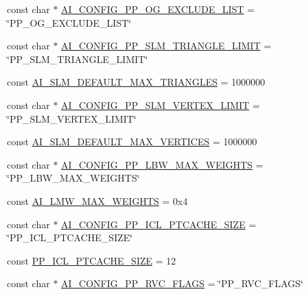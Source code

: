 \begin{DoxyCompactItemize}
\item 
const char $\ast$ \hyperlink{namespaceassimp_1_1config_a6d97e821d31bab71a6f4bae280a127a2}{A\+I\+\_\+\+C\+O\+N\+F\+I\+G\+\_\+\+P\+P\+\_\+\+O\+G\+\_\+\+E\+X\+C\+L\+U\+D\+E\+\_\+\+L\+I\+S\+T} = \char`\"{}P\+P\+\_\+\+O\+G\+\_\+\+E\+X\+C\+L\+U\+D\+E\+\_\+\+L\+I\+S\+T\char`\"{}
\item 
const char $\ast$ \hyperlink{namespaceassimp_1_1config_a63b46327cb4682e7e19471c787307482}{A\+I\+\_\+\+C\+O\+N\+F\+I\+G\+\_\+\+P\+P\+\_\+\+S\+L\+M\+\_\+\+T\+R\+I\+A\+N\+G\+L\+E\+\_\+\+L\+I\+M\+I\+T} = \char`\"{}P\+P\+\_\+\+S\+L\+M\+\_\+\+T\+R\+I\+A\+N\+G\+L\+E\+\_\+\+L\+I\+M\+I\+T\char`\"{}
\item 
const \hyperlink{namespaceassimp_1_1config_a53c98559d8d9613a5823df0a5c593c1e}{A\+I\+\_\+\+S\+L\+M\+\_\+\+D\+E\+F\+A\+U\+L\+T\+\_\+\+M\+A\+X\+\_\+\+T\+R\+I\+A\+N\+G\+L\+E\+S} = 1000000
\item 
const char $\ast$ \hyperlink{namespaceassimp_1_1config_a7efcd666dddd6efdd21dbacdc5a66fec}{A\+I\+\_\+\+C\+O\+N\+F\+I\+G\+\_\+\+P\+P\+\_\+\+S\+L\+M\+\_\+\+V\+E\+R\+T\+E\+X\+\_\+\+L\+I\+M\+I\+T} = \char`\"{}P\+P\+\_\+\+S\+L\+M\+\_\+\+V\+E\+R\+T\+E\+X\+\_\+\+L\+I\+M\+I\+T\char`\"{}
\item 
const \hyperlink{namespaceassimp_1_1config_a645fca237d08bc2d47da2a932c60a303}{A\+I\+\_\+\+S\+L\+M\+\_\+\+D\+E\+F\+A\+U\+L\+T\+\_\+\+M\+A\+X\+\_\+\+V\+E\+R\+T\+I\+C\+E\+S} = 1000000
\item 
const char $\ast$ \hyperlink{namespaceassimp_1_1config_aa43cd229320d7c01e9d8ade92b3c0e5e}{A\+I\+\_\+\+C\+O\+N\+F\+I\+G\+\_\+\+P\+P\+\_\+\+L\+B\+W\+\_\+\+M\+A\+X\+\_\+\+W\+E\+I\+G\+H\+T\+S} = \char`\"{}P\+P\+\_\+\+L\+B\+W\+\_\+\+M\+A\+X\+\_\+\+W\+E\+I\+G\+H\+T\+S\char`\"{}
\item 
const \hyperlink{namespaceassimp_1_1config_a3a423bb71c6ebdb6adba6ca1008c5d68}{A\+I\+\_\+\+L\+M\+W\+\_\+\+M\+A\+X\+\_\+\+W\+E\+I\+G\+H\+T\+S} = 0x4
\item 
const char $\ast$ \hyperlink{namespaceassimp_1_1config_ada3e280af847875daf4d19c98526a470}{A\+I\+\_\+\+C\+O\+N\+F\+I\+G\+\_\+\+P\+P\+\_\+\+I\+C\+L\+\_\+\+P\+T\+C\+A\+C\+H\+E\+\_\+\+S\+I\+Z\+E} = \char`\"{}P\+P\+\_\+\+I\+C\+L\+\_\+\+P\+T\+C\+A\+C\+H\+E\+\_\+\+S\+I\+Z\+E\char`\"{}
\item 
const \hyperlink{namespaceassimp_1_1config_ab1622056938a6fc88aff952086419992}{P\+P\+\_\+\+I\+C\+L\+\_\+\+P\+T\+C\+A\+C\+H\+E\+\_\+\+S\+I\+Z\+E} = 12
\item 
const char $\ast$ \hyperlink{namespaceassimp_1_1config_aedb303ccb1ccc2e8af792c093dd9260c}{A\+I\+\_\+\+C\+O\+N\+F\+I\+G\+\_\+\+P\+P\+\_\+\+R\+V\+C\+\_\+\+F\+L\+A\+G\+S} = \char`\"{}P\+P\+\_\+\+R\+V\+C\+\_\+\+F\+L\+A\+G\+S\char`\"{}

\end{DoxyCompactItemize}
